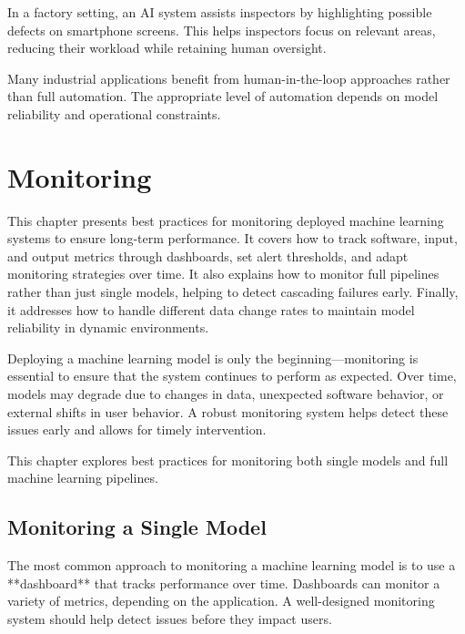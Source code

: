 \documentclass[12pt,openany]{book}
\begin{document}
\begin{examplebox}
   In a factory setting, an AI system assists inspectors by highlighting possible defects on smartphone screens. This helps inspectors focus on relevant areas, reducing their workload while retaining human oversight.
\end{examplebox}

Many industrial applications benefit from human-in-the-loop approaches rather than full automation. The appropriate level of automation depends on model reliability and operational constraints.






\chapter{Monitoring}

\begin{examplebox} 
This chapter presents best practices for monitoring deployed machine learning systems to ensure long-term performance. It covers how to track software, input, and output metrics through dashboards, set alert thresholds, and adapt monitoring strategies over time. It also explains how to monitor full pipelines rather than just single models, helping to detect cascading failures early. Finally, it addresses how to handle different data change rates to maintain model reliability in dynamic environments. 
\end{examplebox}

Deploying a machine learning model is only the beginning—monitoring is essential to ensure that the system continues to perform as expected. Over time, models may degrade due to changes in data, unexpected software behavior, or external shifts in user behavior. A robust monitoring system helps detect these issues early and allows for timely intervention.

This chapter explores best practices for monitoring both single models and full machine learning pipelines.



\section{Monitoring a Single Model}

The most common approach to monitoring a machine learning model is to use a **dashboard** that tracks performance over time. Dashboards can monitor a variety of metrics, depending on the application. A well-designed monitoring system should help detect issues before they impact users.
\end{document}
